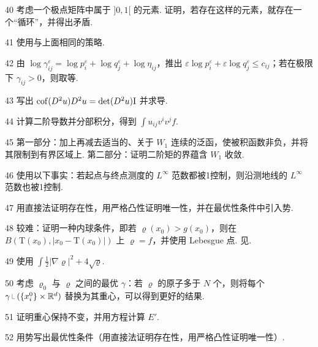 \begin{sourcehint}{40}
考虑一个极点矩阵中属于 $]0,1[$ 的元素. 证明，若存在这样的元素，就存在一个“循环”，并得出矛盾.
\end{sourcehint}
\begin{sourcehint}{41}
使用与上面相同的策略.
\end{sourcehint}
\begin{sourcehint}{42}
由 $\log\gamma_{ij}^\varepsilon=\log p_i^\varepsilon+\log q_j^\varepsilon+\log\eta_{ij}$，推出 $\varepsilon\log p_i^\varepsilon+\varepsilon\log q_j^\varepsilon\leq c_{ij}$；若在极限下 $\gamma_{ij}>0$，则取等.
\end{sourcehint}
\begin{sourcehint}{43}
写出 $\operatorname{cof}(D^2u)D^2u=\det(D^2u)\mathrm I$ 并求导.
\end{sourcehint}
\begin{sourcehint}{44}
计算二阶导数并分部积分，得到 $\int u_{ij}v^iv^jf$.
\end{sourcehint}
\begin{sourcehint}{45}
第一部分：加上再减去适当的、关于 $W_1$ 连续的泛函，使被积函数非负，并将其限制到有界区域上. 第二部分：证明二阶矩的界蕴含 $W_1$ 收敛.
\end{sourcehint}
\begin{sourcehint}{46}
使用以下事实：若起点与终点测度的 $L^\infty$ 范数都被1控制，则沿测地线的 $L^\infty$ 范数也被1控制.
\end{sourcehint}
\begin{sourcehint}{47}
用直接法证明存在性，用严格凸性证明唯一性，并在最优性条件中引入势.
\end{sourcehint}
\begin{sourcehint}{48}
较难：证明一种内球条件，即若 $\varrho(x_0)>g(x_0)$，则在 $B(\mathrm T(x_0),|x_0-\mathrm T(x_0)|)$ 上 $\varrho=f$，并使用 Lebesgue 点. 见\cite{b151}.
\end{sourcehint}
\begin{sourcehint}{49}
使用 $\int\frac12|\nabla\varrho|^2+4\sqrt\varrho$.
\end{sourcehint}
\begin{sourcehint}{50}
考虑 $\varrho_0$ 与 $\varrho$ 之间的最优 $\gamma$：若 $\varrho$ 的原子多于 $N$ 个，则将每个 $\gamma\restr(\{x_i^0\}\times\R^d)$ 替换为其重心，可以得到更好的结果.
\end{sourcehint}
\begin{sourcehint}{51}
证明重心保持不变，并用方程计算 $E'$.
\end{sourcehint}
\begin{sourcehint}{52}
用势写出最优性条件（用直接法证明存在性，用严格凸性证明\mbox{唯一性）.}
\end{sourcehint}
